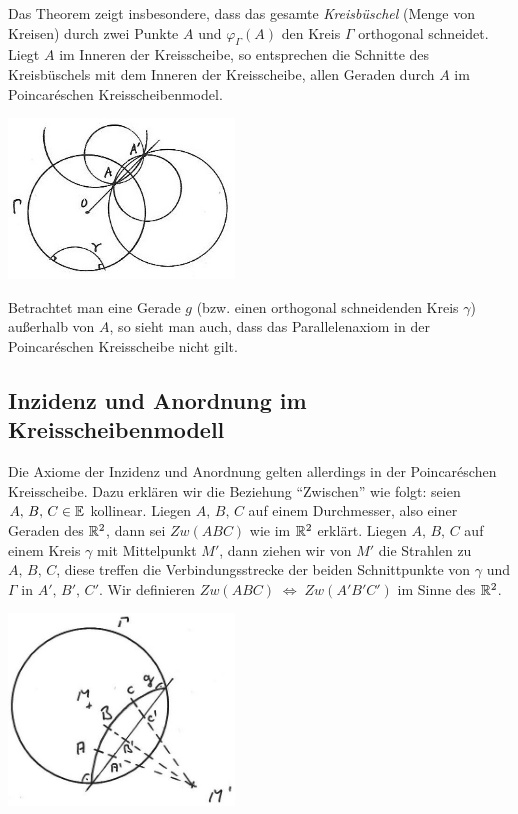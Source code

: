 Das Theorem zeigt insbesondere, dass das gesamte {\em Kreisbüschel} (Menge von Kreisen) durch zwei
Punkte $A$ und $\varphi_\Gamma(A)$ den Kreis $\Gamma$ orthogonal schneidet. Liegt $A$ im Inneren
der Kreisscheibe, so entsprechen die Schnitte des Kreisbüschels mit dem Inneren der Kreisscheibe,
allen Geraden durch $A$ im Poincaréschen Kreisscheibenmodel.

\centerline{\includegraphics[width=6cm]{BILDER/4-2-06-Parallel.jpg}}

Betrachtet man eine Gerade $g$ (bzw. einen orthogonal schneidenden Kreis $\gamma$) außerhalb von
$A$, so sieht man auch, dass das Parallelenaxiom in der Poincaréschen Kreisscheibe nicht gilt.

\subsection*{Inzidenz und Anordnung im Kreisscheibenmodell}

Die Axiome der Inzidenz und Anordnung gelten allerdings in der Poincaréschen Kreisscheibe. Dazu
erklären wir die Beziehung "`Zwischen"' wie folgt: seien $A,\, B,\, C \in \mathbb E$ kollinear. Liegen
$A,\, B,\, C$ auf einem Durchmesser, also einer Geraden des $\mathbb R^2$, dann sei $Zw(ABC)$ wie im $\mathbb R^2$
erklärt. Liegen $A,\, B,\, C$ auf einem Kreis $\gamma$ mit Mittelpunkt $M'$, dann ziehen wir von
$M'$ die Strahlen zu $A,\, B,\, C$, diese treffen die Verbindungsstrecke der beiden Schnittpunkte
von $\gamma$ und $\Gamma$ in $A',\, B',\, C'$. Wir definieren $Zw(ABC)\; \Leftrightarrow\;
Zw(A'B'C')$ im Sinne des $\mathbb R^2$.

\centerline{\includegraphics[width=6cm]{BILDER/4-2-07-Zwischen.jpg}}

